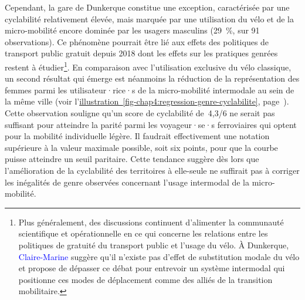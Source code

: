 \begin{refsegment}
Cependant, la gare de Dunkerque constitue une exception, caractérisée par une cyclabilité relativement élevée, mais marquée par une utilisation du vélo et de la micro-mobilité encore dominée par les usagers masculins (29~\%, sur 91 observations). Ce phénomène pourrait être lié aux effets des politiques de transport public gratuit depuis 2018 \textcolor{blue}{\autocite{heran_transports_2020}} dont les effets sur les pratiques genrées restent à étudier\footnote{
    Plus généralement, des discussions continuent d'alimenter la communauté scientifique et opérationnelle en ce qui concerne les relations entre les politiques de gratuité du transport public et l'usage du vélo. À Dunkerque, \textcolor{blue}{Claire-Marine} \textcolor{blue}{\textcite[89]{javary_gratuite_2020}} suggère qu'il n'existe pas d'effet de substitution modale du vélo et propose de dépasser ce débat pour entrevoir un système intermodal qui positionne ces modes de déplacement comme des alliés de la transition mobilitaire.
}. En comparaison avec l'utilisation exclusive du vélo classique, un second résultat qui émerge est néanmoins la réduction de la représentation des femmes parmi les utilisateur·rice·s de la micro-mobilité intermodale au sein de la même ville (voir l'\hyperref[fig-chap4:regression-genre-cyclabilite]{illustration~\ref{fig-chap4:regression-genre-cyclabilite}}, page~\pageref{fig-chap4:regression-genre-cyclabilite}). Cette observation souligne qu'un score de cyclabilité de~4,3/6 ne serait pas suffisant pour atteindre la parité parmi les voyageur·se·s ferroviaires qui optent pour la mobilité individuelle légère. Il faudrait effectivement une notation supérieure à la valeur maximale possible, soit six points, pour que la courbe puisse atteindre un seuil paritaire. Cette tendance suggère dès lors que l'amélioration de la cyclabilité des territoires à elle-seule ne suffirait pas à corriger les inégalités de genre observées concernant l'usage intermodal de la micro-mobilité.%


\end{refsegment}
